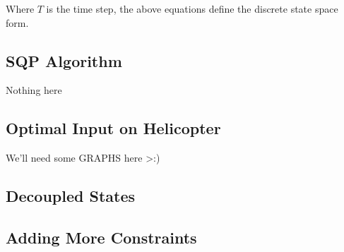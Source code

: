 Where $T$ is the time step, the above equations define the discrete state space form.

\subsection{SQP Algorithm}
Nothing here

\subsection{Optimal Input on Helicopter}
We'll need some GRAPHS here >:)

\subsection{Decoupled States}

\subsection{Adding More Constraints}


